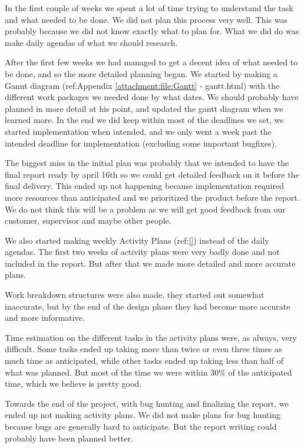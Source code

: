 In the first couple of weeks we spent a lot of time trying to understand the task and what needed to be done. We did not plan this process very well. This was probably because we did not know exactly what to plan for. What we did do was make daily agendas of what we should research.

After the first few weeks we had managed to get a decent idea of what needed to be done, and so the more detailed planning began. We started by making a Gannt diagram (ref:Appendix \ref{attachment:file:Gantt} - gantt.html) with the different work packages we needed done by what dates. We should probably have planned in more detail at his point, and updated the gantt diagram when we learned more. In the end we did keep within most of the deadlines we set, we started implementation when intended, and we only went a week past the intended deadline for implementation (excluding some important bugfixes). 

The biggest miss in the initial plan was probably that we intended to have the final report ready by april 16th so we could get detailed feedback on it before the final delivery. This ended up not happening because implementation required more resources than anticipated and we prioritized the product before the report. We do not think this will be a problem as we will get good feedback from our customer, supervisor and maybe other people.

We also started making weekly Activity Plans (ref:\ref{}) instead of the daily agendas. The first two weeks of activity plans were very badly done and not included in the report. But after that we made more detailed and more accurate plans.

Work breakdown structures were also made, they started out somewhat inaccurate, but by the end of the design phase they had become more accurate and more informative. 

Time estimation on the different tasks in the activity plans were, as always, very difficult. Some tasks ended up taking more than twice or even three times as much time as anticipated, while other tasks ended up taking less than half of what was planned. But most of the time we were within 30\% of the anticipated time, which we believe is pretty good.

Towards the end of the project, with bug hunting and finalizing the report, we ended up not making activity plans. We did not make plans for bug hunting because bugs are generally hard to anticipate. But the report writing could probably have been planned better.
